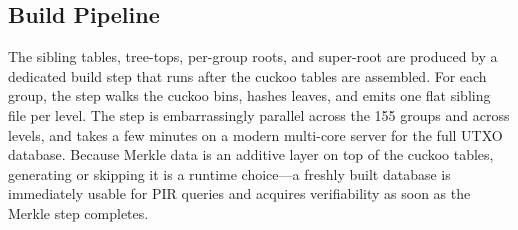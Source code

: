 \subsection{Build Pipeline}

The sibling tables, tree-tops, per-group roots, and super-root are produced by a dedicated build step that runs after the cuckoo tables are assembled. For each group, the step walks the cuckoo bins, hashes leaves, and emits one flat sibling file per level. The step is embarrassingly parallel across the 155 groups and across levels, and takes a few minutes on a modern multi-core server for the full UTXO database. Because Merkle data is an additive layer on top of the cuckoo tables, generating or skipping it is a runtime choice---a freshly built database is immediately usable for PIR queries and acquires verifiability as soon as the Merkle step completes.
